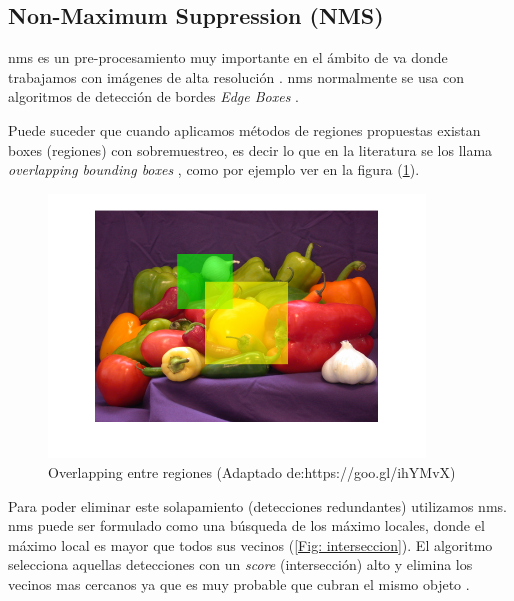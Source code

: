 \subsection{Non-Maximum Suppression (NMS)}\label{sub:nonmaximumsuppression}

\ac{nms} es un pre-procesamiento muy importante en el ámbito de \ac{va}  donde trabajamos con imágenes de alta resolución \citep{nms}.  \ac{nms} normalmente se usa con algoritmos de detección de bordes \textit{Edge Boxes} .

Puede  suceder que cuando aplicamos métodos de regiones propuestas existan boxes (regiones) con sobremuestreo, es decir lo que en la literatura se los llama \textit{overlapping bounding boxes} , como por ejemplo ver en la figura (\ref{Fig: overlapping}). 

\begin{figure}[H]
 \centering
  \includegraphics[height=7cm,keepaspectratio=true,clip=true]{imagenes/Logos/overlapMat.png}
  \caption{Overlapping entre regiones (Adaptado de:{https://goo.gl/ihYMvX})}
	\label{Fig: overlapping}
\end{figure}

Para poder eliminar este solapamiento (detecciones redundantes) utilizamos \ac{nms}. \ac{nms} puede ser formulado como una búsqueda de los máximo locales, donde el máximo local es  mayor que todos sus vecinos (\ref{Fig: interseccion}). El algoritmo selecciona aquellas detecciones con un \textit{score} (intersección) alto y elimina los vecinos mas cercanos ya que es muy probable que cubran el mismo objeto \citep{nms2}.

